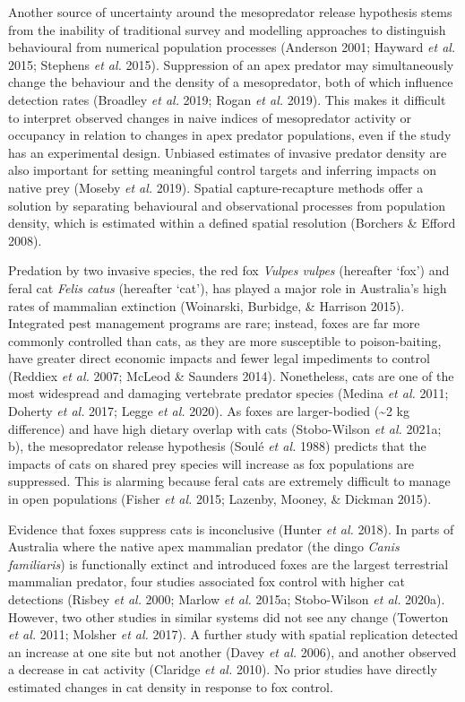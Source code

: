 \documentclass[11pt,a4paper,titlepage,twoside,openright]{style/unimelbthesis}
\begin{document}
\begin{mainmatter}
Another source of uncertainty around the mesopredator release hypothesis stems from the inability of traditional survey and modelling approaches to distinguish behavioural from numerical population processes (Anderson 2001; Hayward \emph{et al.} 2015; Stephens \emph{et al.} 2015). Suppression of an apex predator may simultaneously change the behaviour and the density of a mesopredator, both of which influence detection rates (Broadley \emph{et al.} 2019; Rogan \emph{et al.} 2019). This makes it difficult to interpret observed changes in naive indices of mesopredator activity or occupancy in relation to changes in apex predator populations, even if the study has an experimental design. Unbiased estimates of invasive predator density are also important for setting meaningful control targets and inferring impacts on native prey (Moseby \emph{et al.} 2019). Spatial capture-recapture methods offer a solution by separating behavioural and observational processes from population density, which is estimated within a defined spatial resolution (Borchers \& Efford 2008).

Predation by two invasive species, the red fox \emph{Vulpes vulpes} (hereafter `fox') and feral cat \emph{Felis catus} (hereafter `cat'), has played a major role in Australia's high rates of mammalian extinction (Woinarski, Burbidge, \& Harrison 2015). Integrated pest management programs are rare; instead, foxes are far more commonly controlled than cats, as they are more susceptible to poison-baiting, have greater direct economic impacts and fewer legal impediments to control (Reddiex \emph{et al.} 2007; McLeod \& Saunders 2014). Nonetheless, cats are one of the most widespread and damaging vertebrate predator species (Medina \emph{et al.} 2011; Doherty \emph{et al.} 2017; Legge \emph{et al.} 2020). As foxes are larger-bodied (\textasciitilde2 kg difference) and have high dietary overlap with cats (Stobo-Wilson \emph{et al.} 2021a; b), the mesopredator release hypothesis (Soulé \emph{et al.} 1988) predicts that the impacts of cats on shared prey species will increase as fox populations are suppressed. This is alarming because feral cats are extremely difficult to manage in open populations (Fisher \emph{et al.} 2015; Lazenby, Mooney, \& Dickman 2015).

Evidence that foxes suppress cats is inconclusive (Hunter \emph{et al.} 2018). In parts of Australia where the native apex mammalian predator (the dingo \emph{Canis familiaris}) is functionally extinct and introduced foxes are the largest terrestrial mammalian predator, four studies associated fox control with higher cat detections (Risbey \emph{et al.} 2000; Marlow \emph{et al.} 2015a; Stobo-Wilson \emph{et al.} 2020a). However, two other studies in similar systems did not see any change (Towerton \emph{et al.} 2011; Molsher \emph{et al.} 2017). A further study with spatial replication detected an increase at one site but not another (Davey \emph{et al.} 2006), and another observed a decrease in cat activity (Claridge \emph{et al.} 2010). No prior studies have directly estimated changes in cat density in response to fox control.


\end{mainmatter}
\end{document}
